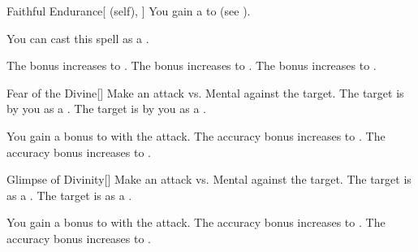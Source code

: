 \lowercase{\hypertarget{spell:Faithful Endurance}{}}\label{spell:Faithful Endurance}
\begin{attuneability}[Rank 1]{\hypertarget{spell:Faithful Endurance}{Faithful Endurance}}[ (self), ]
You gain a   to  (see ).

You can cast this spell as a .

\rankline
{} The bonus increases to .
 The bonus increases to .
 The bonus increases to .
\end{attuneability}
\vspace{0.25em}



\lowercase{\hypertarget{spell:Fear of the Divine}{}}\label{spell:Fear of the Divine}
\begin{freeability}[Rank 1]{\hypertarget{spell:Fear of the Divine}{Fear of the Divine}}[]
Make an attack vs. Mental against the target.
\hit The target is \shaken by you as a .
\crit The target is  by you as a .

\rankline
{} You gain a  bonus to  with the attack.
 The accuracy bonus increases to .
 The accuracy bonus increases to .
\end{freeability}
\vspace{0.25em}



\lowercase{\hypertarget{spell:Glimpse of Divinity}{}}\label{spell:Glimpse of Divinity}
\begin{freeability}[Rank 1]{\hypertarget{spell:Glimpse of Divinity}{Glimpse of Divinity}}[]
Make an attack vs. Mental against the target.
\hit The target is  as a .
\crit The target is  as a .

\rankline
{} You gain a  bonus to  with the attack.
 The accuracy bonus increases to .
 The accuracy bonus increases to .
\end{freeability}
\vspace{0.25em}



